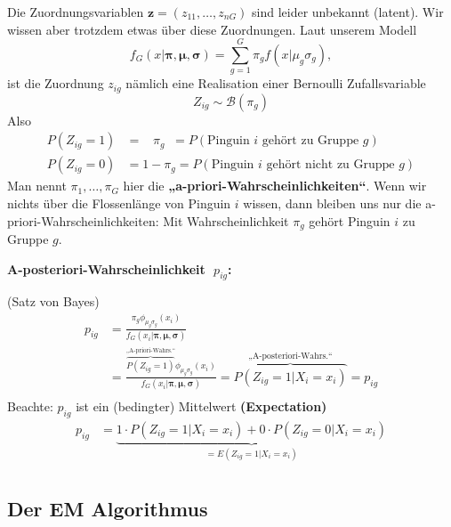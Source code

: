 \documentclass[
]{book}
\begin{document}
Die Zuordnungsvariablen \(\mathbf{z}=(z_{11},\dots,z_{nG})\) sind leider unbekannt (latent). Wir wissen aber trotzdem etwas über diese Zuordnungen. Laut unserem Modell
\[
f_G(x|\boldsymbol{\pi},\boldsymbol{\mu},\boldsymbol{\sigma})=\sum_{g=1}^G\pi_gf(x|\mu_g\sigma_g),
\]
ist die Zuordnung \(z_{ig}\) nämlich eine Realisation einer Bernoulli Zufallsvariable
\[
Z_{ig}\sim\mathcal{B}(\pi_g)
\]
Also
\[
\begin{align*}
P(Z_{ig}=1)&=\;\;\;\pi_g\;\;=P(\text{Pinguin $i$ gehört zu Gruppe }g)\\
P(Z_{ig}=0)&=1-\pi_g=P(\text{Pinguin $i$ gehört nicht zu Gruppe }g)
\end{align*}
\]
Man nennt \(\pi_1,\dots,\pi_G\) hier die \textbf{„a-priori-Wahrscheinlichkeiten``}. Wenn wir nichts über die Flossenlänge von Pinguin \(i\) wissen, dann bleiben uns nur die a-priori-Wahrscheinlichkeiten: Mit Wahrscheinlichkeit \(\pi_g\) gehört Pinguin \(i\) zu Gruppe \(g\).

\textbf{A-posteriori-Wahrscheinlichkeit \(\;p_{ig}\):}

(Satz von Bayes)
\[
\begin{align*}
p_{ig}
&=\frac{\pi_g\phi_{\mu_g\sigma_g}(x_i)}{f_G(x_i|\boldsymbol{\pi},\boldsymbol{\mu},\boldsymbol{\sigma})}\\[2ex]
&=\frac{\overbrace{P(Z_{ig}=1)}^{\text{„A-priori-Wahrs.“}}\phi_{\mu_g\sigma_g}(x_i)}{f_G(x_i|\boldsymbol{\pi},\boldsymbol{\mu},\boldsymbol{\sigma})}=\overbrace{P(Z_{ig}=1|X_i=x_i)}^{\text{„A-posteriori-Wahrs.“}}=p_{ig}\\
\end{align*}
\]
Beachte: \(p_{ig}\) ist ein (bedingter) Mittelwert {\textbf{(Expectation)}}
\[
\begin{align*}
p_{ig}&=\underbrace{1\cdot P(Z_{ig}=1|X_i=x_i)+0\cdot P(Z_{ig}=0|X_i=x_i)}_{=E(Z_{ig}=1|X_i=x_i)}\\
\end{align*}
\]

\hypertarget{der-em-algorithmus}{%
\subsection*{\texorpdfstring{Der {E}{M} Algorithmus}{Der EM Algorithmus}}\label{der-em-algorithmus}}
\end{document}
